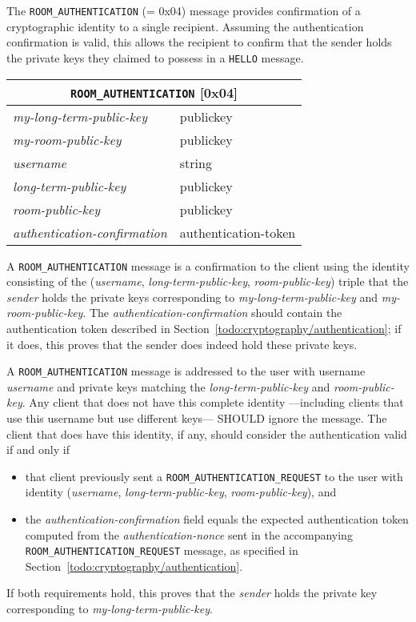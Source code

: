 \documentclass{article}
\def\message#1{\texttt{#1}}
\def\field#1{\textit{#1}}
\newenvironment{basicmessage}[2]{
\newcommand{\messagefield}[2]{
\field{##1} & \textsf{##2} \\
\hline
}
\begin{tabular}{|l|l|}
\hline
\multicolumn{2}{|c|}{\message{#1} [#2]} \\
\hline
\hline
}{
\end{tabular}
}
\begin{document}
The \message{ROOM\_AUTHENTICATION} (= 0x04) message provides confirmation of a cryptographic identity to a single recipient.
Assuming the authentication confirmation is valid, this allows the recipient to confirm that the sender holds the private keys they claimed to possess in a \message{HELLO} message.

\begin{basicmessage}{ROOM\_AUTHENTICATION}{0x04}
\messagefield{my-long-term-public-key}{publickey}
\messagefield{my-room-public-key}{publickey}
\messagefield{username}{string}
\messagefield{long-term-public-key}{publickey}
\messagefield{room-public-key}{publickey}
\messagefield{authentication-confirmation}{authentication-token}
\end{basicmessage}

A \message{ROOM\_AUTHENTICATION} message is a confirmation to the client using the identity consisting of the (\field{username}, \field{long-term-public-key}, \field{room-public-key}) triple that the \field{sender} holds the private keys corresponding to \field{my-long-term-public-key} and \field{my-room-public-key}.
The \emph{authentication-confirmation} should contain the authentication token described in Section~\ref{todo:cryptography/authentication}; if it does, this proves that the sender does indeed hold these private keys.

A \message{ROOM\_AUTHENTICATION} message is addressed to the user with username \field{username} and private keys matching the \field{long-term-public-key} and \field{room-public-key}.
Any client that does not have this complete identity ---including clients that use this username but use different keys--- SHOULD ignore the message.
The client that does have this identity, if any, should consider the authentication valid if and only if
\begin{itemize}
\item that client previously sent a \message{ROOM\_AUTHENTICATION\_REQUEST} to the user with identity (\field{username}, \field{long-term-public-key}, \field{room-public-key}), and
\item the \field{authentication-confirmation} field equals the expected authentication token computed from the \field{authentication-nonce} sent in the accompanying \message{ROOM\_AUTHENTICATION\_REQUEST} message, as specified in Section~\ref{todo:cryptography/authentication}.
\end{itemize}
If both requirements hold, this proves that the \field{sender} holds the private key corresponding to \field{my-long-term-public-key}.
\end{document}
